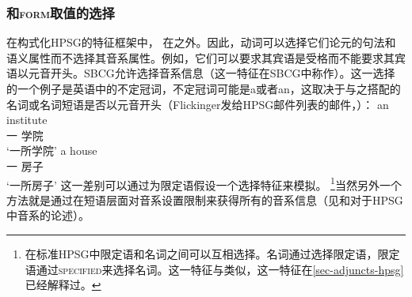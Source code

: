 \subsubsection{\phon 和\textsc{form}取值的选择}

在构式化HPSG的特征框架中， \phonvc 在\synsemc 之外。因此，动词可以选择它们论元的句法和语义属性而不选择其音系属性。例如，它们可以要求其宾语是受格而不能要求其宾语以元音开头。SBCG允许选择音系信息（这一特征在SBCG中称作\formc）。这一选择的一个例子是英语中的不定冠词，不定冠词可能是a或者an，这取决于与之搭配的名词或名词短语是否以元音开头（Flickinger发给HPSG邮件列表的邮件，）：
\eal
\ex 
\gll an institute\\
     一 学院\\
\glt `一所学院'
\ex 
\gll a  house\\
     一 房子\\
\glt `一所房子'
\zl
这一差别可以通过为限定语假设一个选择特征来模拟。 \footnote{%
  在标准HPSG中限定语和名词之间可以互相选择。名词通过\sprc 选择限定语，限定语通过\textsc{specified}来选择名词。这一特征与\modfc 类似，这一特征在\ref{sec-adjuncts-hpsg}已经解释过。
}当然另外一个方法就是通过在短语层面对音系设置限制来获得所有的音系信息（见\citealp{BK94b}和\citealp{Walther99a-u}对于HPSG中音系的论述）。

